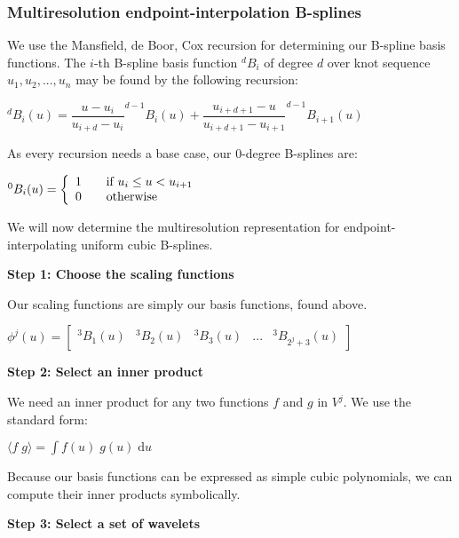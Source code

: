\documentclass[11pt]{article}
\begin{document}
\subsubsection{Multiresolution endpoint-interpolation B-splines}
\label{sec:bsplines}

We use the Mansfield, de Boor, Cox recursion for determining our B-spline basis functions. The $i$-th B-spline basis function $^{d}B_{i}$ of degree $d$ over knot sequence $u_{1}, u_{2}, ..., u_{n}$ may be found by the following recursion:
\begin{center}
$^{d}B_{i}(u) = \dfrac{u - u_{i}}{u_{i+d} - u_{i}} ^{d-1}B_{i}(u) + \dfrac{u_{i + d + 1} - u}{u_{i + d + 1} - u_{i + 1}} ^{d-1}B_{i+1}(u)$
\end{center}
As every recursion needs a base case, our $0$-degree  B-splines are:
\begin{center}
$^{0}B_{i}(u) =
\left\{
\begin{array}{l l}
1 & \quad \text{if $u_{i} \leq u < u_{i+1}$}\\
0 & \quad \text{otherwise}\\
\end{array}
\right.$
\end{center}

We will now determine the multiresolution representation for endpoint-interpolating uniform cubic B-splines.

\textbf{Step 1: Choose the scaling functions}

Our scaling functions are simply our basis functions, found above.
\begin{center}
$\phi^{j}(u) = \begin{bmatrix} ^{3}B_{1}(u) & ^{3}B_{2}(u) & ^{3}B_{3}(u) & ... & ^{3}B_{2^{j}+3}(u)\end{bmatrix}$
\end{center}

\textbf{Step 2: Select an inner product}

We need an inner product for any two functions $f$ and $g$ in $V^{j}$. We use the standard form:
\begin{center}
$ \langle f\; g \rangle = \int f(u)\; g(u)\; \mathrm{d}u$
\end{center}
Because our basis functions can be expressed as simple cubic polynomials, we can compute their inner products symbolically.

\textbf{Step 3: Select a set of wavelets}
\end{document}
